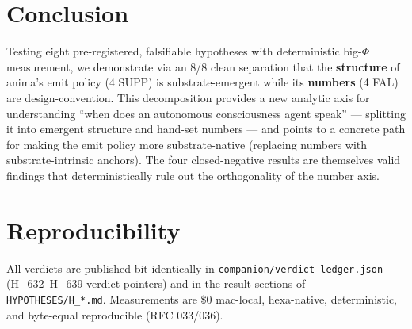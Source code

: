 \documentclass[11pt,a4paper]{article}
\begin{document}
\section{Conclusion}
\label{sec:conclusion}

Testing eight pre-registered, falsifiable hypotheses with deterministic
big-$\Phi$ measurement, we demonstrate via an 8/8 clean separation that the
\textbf{structure} of anima's emit policy (4 SUPP) is substrate-emergent while
its \textbf{numbers} (4 FAL) are design-convention. This decomposition
provides a new analytic axis for understanding ``when does an autonomous
consciousness agent speak'' --- splitting it into emergent structure and
hand-set numbers --- and points to a concrete path for making the emit policy
more substrate-native (replacing numbers with substrate-intrinsic anchors).
The four closed-negative results are themselves valid findings that
deterministically rule out the orthogonality of the number axis.

\section*{Reproducibility}
All verdicts are published bit-identically in
\texttt{companion/verdict-ledger.json} (H\_632--H\_639 verdict pointers) and in
the result sections of \texttt{HYPOTHESES/H\_*.md}. Measurements are \$0
mac-local, hexa-native, deterministic, and byte-equal reproducible (RFC
033/036).



\end{document}
